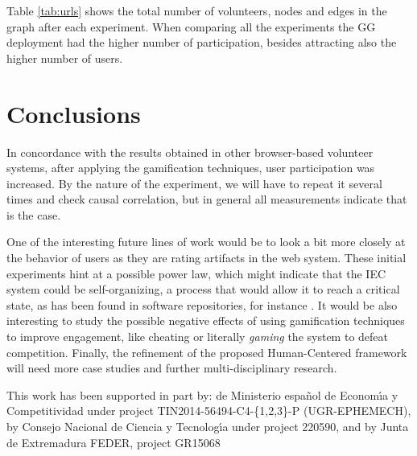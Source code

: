 Table \ref{tab:urls} shows the total number of volunteers, nodes and edges 
in the graph after each experiment. 
When comparing all the experiments the GG deployment had the higher
number of participation, besides attracting also the higher number of users.    

  
\section{Conclusions}
\label{sec:conclusions}

In concordance with the results obtained in other 
browser-based volunteer systems, after 
applying the gamification techniques, user participation was
increased. By the nature of the experiment, we will have to repeat it
several times and check causal correlation, but in general all
measurements indicate that is the case. 

One of the interesting future lines of work would be to look a bit
more closely at the behavior of users as they are rating artifacts 
in the web system. These initial experiments hint at a possible power law, which might indicate that
the IEC system could be self-organizing, a process that would allow it
to reach a critical state, as has been found in software repositories,
for instance \cite{Merelo2016:repomining}. It would be also
interesting to study the possible negative effects of using   
gamification techniques to improve engagement, like cheating or
literally {\em gaming} the system to defeat competition. 
Finally, the refinement of the proposed Human-Centered framework will need
more case studies and further multi-disciplinary research. 

\begin{acks}
This work has been supported in part by: de Ministerio espa\~{n}ol de Econom\'{\i}a y Competitividad under project TIN2014-56494-C4-\{1,2,3\}-P (UGR-EPHEMECH), by Consejo Nacional de Ciencia y Tecnolog\'{\i}a under project 220590, and by Junta de Extremadura FEDER, project GR15068




\end{acks}
